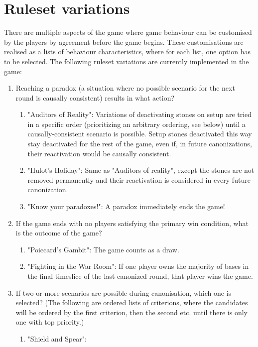 \documentclass[12pt]{article}
\begin{document}
	\section{Ruleset variations}\label{sec:ruleset variations}
	There are multiple aspects of the game where game behaviour can be customised by the players by agreement before the game begins. These customisations are realised as a lists of behaviour characteristics, where for each list, one option has to be selected. The following ruleset variations are currently implemented in the game:
	\begin{enumerate}
		\item Reaching a paradox (a situation where no possible scenario for the next round is causally consistent) results in what action?
		\begin{enumerate}
			\item "Auditors of Reality": Variations of deactivating stones on setup are tried in a specific order (prioritizing an arbitrary ordering, see below) until a causally-consistent scenario is possible. Setup stones deactivated this way stay deactivated for the rest of the game, even if, in future canonizations, their reactivation would be causally consistent.
			\item "Hulot's Holiday": Same as "Auditors of reality", except the stones are not removed permanently and their reactivation is considered in every future canonization.
			\item "Know your paradoxes!": A paradox immediately ends the game!
		\end{enumerate}
		\item If the game ends with no players satisfying the primary win condition, what is the outcome of the game?
		\begin{enumerate}
			\item "Poiccard's Gambit": The game counts as a draw.
			\item "Fighting in the War Room": If one player owns the majority of bases in the final timeslice of the last canonized round, that player wins the game.
		\end{enumerate}
		\item If two or more scenarios are possible during canonisation, which one is selected? (The following are ordered lists of criterions, where the candidates will be ordered by the first criterion, then the second etc. until there is only one with top priority.)
		\begin{enumerate}
			\item "Shield and Spear":

\end{enumerate}
\end{enumerate}
\end{document}
